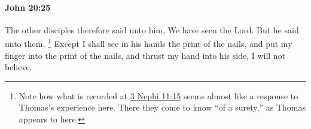 			\begin{framed}
				\scriptsize
				\begin{compactdesc}
					\item[SBLG] 
				\end{compactdesc}
			\end{framed}

		\paragraph{John 20:25} %
			\label{JOHN-20-25}

			The other disciples therefore said unto him, We have seen the Lord. But he said unto them,
				\footnote{%
					Note how what is recorded at \hyperref[3NEPHI-11-15]{3 Nephi 11:15} seems almost like a response to Thomas's experience here. There they come to know ``of a surety,'' as Thomas appears to here.
					}%
			Except I shall see in his hands the print of the nails, and put my finger into the print of the nails, and thrust my hand into his side, I will not believe.

